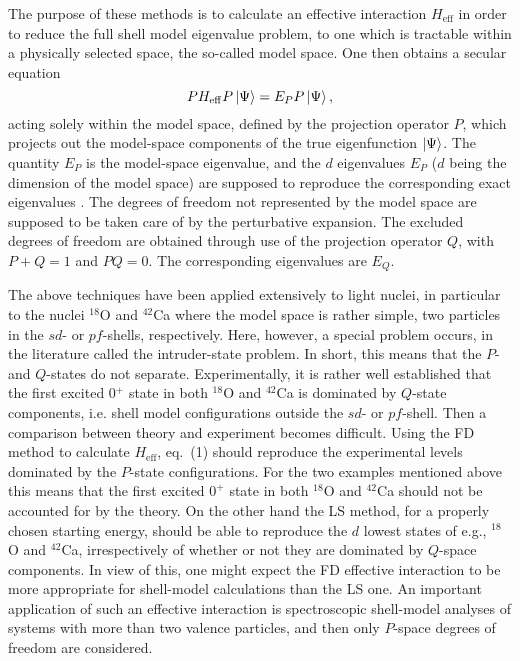 The purpose of these methods is to calculate an
effective interaction $H_{\mathrm{eff}}$
in order to reduce the full shell model eigenvalue problem,
to one which
is tractable within a physically selected space, the so-called
model space. One then obtains a secular equation
\begin{equation}
PH_{\mathrm{eff}}P\left| \Psi \right\rangle= E_P P\left| \Psi \right\rangle,
\end{equation}
acting solely within the model space, defined by the projection operator
$P$, which projects out the model-space 
components of the true eigenfunction
$\left| \Psi \right\rangle$. The quantity $E_P$ is the model-space
eigenvalue, and the $d$ eigenvalues $E_P$ ($d$ being the
dimension of the model space) are supposed to 
reproduce the corresponding
exact eigenvalues \cite{ko90}.
The degrees of freedom not represented by the model
space are supposed to be taken care of by the perturbative expansion.
The excluded degrees of freedom are obtained through use
of the projection operator $Q$, with $P+Q=1$ and $PQ=0$. 
The corresponding eigenvalues are $E_Q$.

The above techniques have been applied extensively to light nuclei,
in particular to the nuclei $^{18}$O and  $^{42}$Ca
where the  model space is rather simple,
two particles in the $sd$- or $pf$-shells, respectively.
Here, however, a special problem occurs, in the literature  called
the intruder-state problem. In short, this means that the $P$-
and $Q$-states do not separate. Experimentally, it is rather
well established
that the first excited 0$^{+}$ state in both $^{18}$O and  $^{42}$Ca is
dominated by $Q$-state components,
i.e. shell model configurations  outside
the $sd$- or $pf$-shell.
Then a comparison between theory and experiment becomes difficult.
Using the FD method to calculate $H_{\mathrm{eff}}$,
eq.\ (1) should reproduce the experimental levels  dominated by
the $P$-state configurations. For the two examples mentioned above
this means that the first excited $0^{+}$ state in  both 
$^{18}$O and  $^{42}$Ca
should not be accounted for by the theory. On the other hand
the LS method,
for a properly chosen starting energy,
 should be able
to reproduce the  $d$ lowest  states of e.g., $^{18}$O and  $^{42}$Ca,
irrespectively of whether or not they are dominated by
$Q$-space components. In view of this, one might 
expect the FD effective 
interaction to be more appropriate 
for shell-model calculations than the LS one. 
An important application of such an effective interaction is 
spectroscopic shell-model analyses of systems with more than two valence
particles, and then only $P$-space degrees of freedom are considered.


